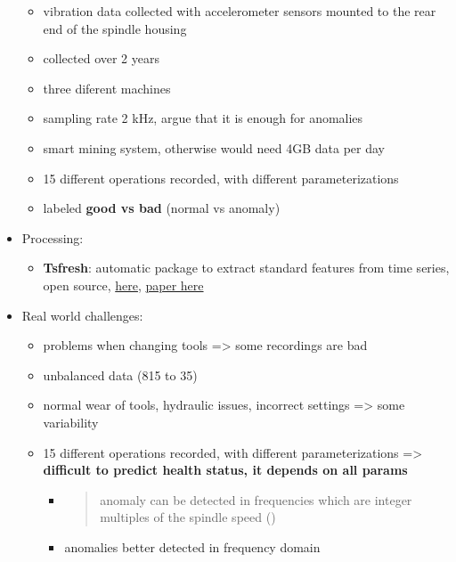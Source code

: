 \documentclass[
  letterpaper,
  DIV=11,
  numbers=noendperiod]{scrartcl}
\providecommand{\tightlist}{%
  \setlength{\itemsep}{0pt}\setlength{\parskip}{0pt}}\usepackage{longtable,booktabs,array}
\begin{document}
\begin{itemize}
  \begin{itemize}
  \tightlist
  \item
    vibration data collected with accelerometer sensors mounted to the
    rear end of the spindle housing
  \item
    collected over 2 years
  \item
    three diferent machines
  \item
    sampling rate 2 kHz, argue that it is enough for anomalies
  \item
    smart mining system, otherwise would need 4GB data per day
  \item
    15 different operations recorded, with different parameterizations
  \item
    labeled \textbf{good vs bad} (normal vs anomaly)
  \end{itemize}
\item
  Processing:

  \begin{itemize}
  \tightlist
  \item
    \textbf{Tsfresh}: automatic package to extract standard features
    from time series, open source,
    \href{https://tsfresh.readthedocs.io/en/latest/}{here},
    \href{https://www.sciencedirect.com/science/article/pii/S0925231218304843}{paper
    here}
  \end{itemize}
\item
  Real world challenges:

  \begin{itemize}
  \tightlist
  \item
    problems when changing tools =\textgreater{} some recordings are bad
  \item
    unbalanced data (815 to 35)
  \item
    normal wear of tools, hydraulic issues, incorrect settings
    =\textgreater{} some variability
  \item
    15 different operations recorded, with different parameterizations
    =\textgreater{} \textbf{difficult to predict health status, it
    depends on all params}

    \begin{itemize}
    \item
      \begin{quote}
      anomaly can be detected in frequencies which are integer multiples
      of the spindle speed ()
      \end{quote}
    \item
      anomalies better detected in frequency domain
    \end{itemize}
  \end{itemize}
\end{itemize}
\end{document}
